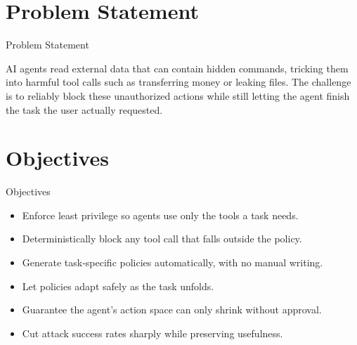 \documentclass[10pt]{beamer}
\begin{document}
\section{Problem Statement}
\begin{frame}{Problem Statement}
  \begin{block}{}
  AI agents read external data that can contain hidden commands, tricking them into harmful tool calls such as transferring money or leaking files. The challenge is to reliably block these unauthorized actions while still letting the agent finish the task the user actually requested.
  \end{block}
\end{frame}
\section{Objectives}
\begin{frame}{Objectives}
\begin{itemize}
  \item Enforce least privilege so agents use only the tools a task needs.
  \item Deterministically block any tool call that falls outside the policy.
  \item Generate task-specific policies automatically, with no manual writing.
  \item Let policies adapt safely as the task unfolds.
  \item Guarantee the agent's action space can only shrink without approval.
  \item Cut attack success rates sharply while preserving usefulness.
\end{itemize}
\end{frame}
\end{document}
